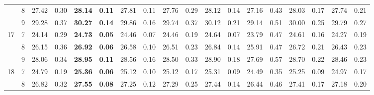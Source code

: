\documentclass[conference]{IEEEtran}
\begin{document}
\begin{table*}[]
\begin{tabular}{|cc|ll|ll|ll|ll|ll|ll|ll|ll|}
		\multicolumn{1}{|c|}{} & 8 & \multicolumn{1}{l|}{27.42} & 0.30 & \multicolumn{1}{l|}{\textbf{28.14}} & \textbf{0.11} & \multicolumn{1}{l|}{27.81} & 0.11 & \multicolumn{1}{l|}{27.76} & 0.29 & \multicolumn{1}{l|}{28.12} & 0.14 & \multicolumn{1}{l|}{27.16} & 0.43 & \multicolumn{1}{l|}{28.03} & 0.17 & \multicolumn{1}{l|}{27.74} & 0.21 \\ \cline{2-18} 
		\multicolumn{1}{|c|}{} & 9 & \multicolumn{1}{l|}{29.28} & 0.37 & \multicolumn{1}{l|}{\textbf{30.27}} & \textbf{0.14} & \multicolumn{1}{l|}{29.86} & 0.16 & \multicolumn{1}{l|}{29.74} & 0.37 & \multicolumn{1}{l|}{30.12} & 0.21 & \multicolumn{1}{l|}{29.14} & 0.51 & \multicolumn{1}{l|}{30.00} & 0.25 & \multicolumn{1}{l|}{29.79} & 0.27 \\ \hline
		\multicolumn{1}{|c|}{\multirow{3}{*}{17}} & 7 & \multicolumn{1}{l|}{24.14} & 0.29 & \multicolumn{1}{l|}{\textbf{24.73}} & \textbf{0.05} & \multicolumn{1}{l|}{24.46} & 0.07 & \multicolumn{1}{l|}{24.46} & 0.19 & \multicolumn{1}{l|}{24.64} & 0.07 & \multicolumn{1}{l|}{23.79} & 0.47 & \multicolumn{1}{l|}{24.61} & 0.16 & \multicolumn{1}{l|}{24.27} & 0.19 \\ \cline{2-18} 
		\multicolumn{1}{|c|}{} & 8 & \multicolumn{1}{l|}{26.15} & 0.36 & \multicolumn{1}{l|}{\textbf{26.92}} & \textbf{0.06} & \multicolumn{1}{l|}{26.58} & 0.10 & \multicolumn{1}{l|}{26.51} & 0.23 & \multicolumn{1}{l|}{26.84} & 0.14 & \multicolumn{1}{l|}{25.91} & 0.47 & \multicolumn{1}{l|}{26.72} & 0.21 & \multicolumn{1}{l|}{26.43} & 0.23 \\ \cline{2-18} 
		\multicolumn{1}{|c|}{} & 9 & \multicolumn{1}{l|}{28.06} & 0.34 & \multicolumn{1}{l|}{\textbf{28.95}} & \textbf{0.11} & \multicolumn{1}{l|}{28.56} & 0.16 & \multicolumn{1}{l|}{28.50} & 0.33 & \multicolumn{1}{l|}{28.90} & 0.18 & \multicolumn{1}{l|}{27.69} & 0.57 & \multicolumn{1}{l|}{28.70} & 0.22 & \multicolumn{1}{l|}{28.46} & 0.23 \\ \hline
		\multicolumn{1}{|c|}{\multirow{3}{*}{18}} & 7 & \multicolumn{1}{l|}{24.79} & 0.19 & \multicolumn{1}{l|}{\textbf{25.36}} & \textbf{0.06} & \multicolumn{1}{l|}{25.12} & 0.10 & \multicolumn{1}{l|}{25.12} & 0.17 & \multicolumn{1}{l|}{25.31} & 0.09 & \multicolumn{1}{l|}{24.49} & 0.35 & \multicolumn{1}{l|}{25.25} & 0.09 & \multicolumn{1}{l|}{24.97} & 0.17 \\ \cline{2-18} 
		\multicolumn{1}{|c|}{} & 8 & \multicolumn{1}{l|}{26.82} & 0.32 & \multicolumn{1}{l|}{\textbf{27.55}} & \textbf{0.08} & \multicolumn{1}{l|}{27.25} & 0.12 & \multicolumn{1}{l|}{27.29} & 0.25 & \multicolumn{1}{l|}{27.44} & 0.14 & \multicolumn{1}{l|}{26.44} & 0.46 & \multicolumn{1}{l|}{27.41} & 0.17 & \multicolumn{1}{l|}{27.18} & 0.20 \\ \cline{2-18} 

\end{tabular}
\end{table*}
\end{document}
